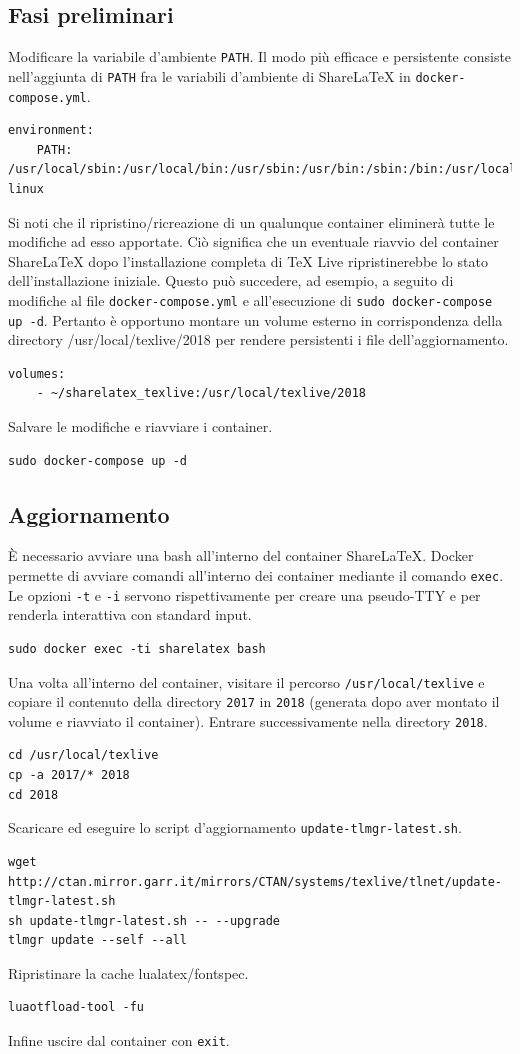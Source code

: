 \subsection{Fasi preliminari}
Modificare la variabile d'ambiente \verb|PATH|. Il modo più efficace e persistente consiste nell'aggiunta di \verb|PATH| fra le variabili d'ambiente di ShareLaTeX in \verb|docker-compose.yml|.
\begin{lstlisting}
environment:
    PATH: /usr/local/sbin:/usr/local/bin:/usr/sbin:/usr/bin:/sbin:/bin:/usr/local/texlive/2018/bin/x86_64-linux
\end{lstlisting}
Si noti che il ripristino/ricreazione di un qualunque container eliminerà tutte le modifiche ad esso apportate. Ciò significa che un eventuale riavvio del container ShareLaTeX dopo l'installazione completa di TeX Live ripristinerebbe lo stato dell'installazione iniziale. Questo può succedere, ad esempio, a seguito di modifiche al file \verb|docker-compose.yml| e all'esecuzione di \verb|sudo docker-compose up -d|. Pertanto è opportuno montare un volume esterno in corrispondenza della directory /usr/local/texlive/2018 per rendere persistenti i file dell'aggiornamento.
\begin{lstlisting}
volumes:
    - ~/sharelatex_texlive:/usr/local/texlive/2018
\end{lstlisting}
Salvare le modifiche e riavviare i container.
\begin{lstlisting}
sudo docker-compose up -d
\end{lstlisting}

\subsection{Aggiornamento}
È necessario avviare una bash all'interno del container ShareLaTeX. Docker permette di avviare comandi all'interno dei container mediante il comando \verb|exec|. Le opzioni \verb|-t| e \verb|-i| servono rispettivamente per creare una pseudo-TTY e per renderla interattiva con standard input.
\begin{lstlisting}
sudo docker exec -ti sharelatex bash
\end{lstlisting}
Una volta all'interno del container, visitare il percorso \verb|/usr/local/texlive| e copiare il contenuto della directory \verb|2017| in \verb|2018| (generata dopo aver montato il volume e riavviato il container). Entrare successivamente nella directory \verb|2018|.
\begin{lstlisting}
cd /usr/local/texlive
cp -a 2017/* 2018
cd 2018
\end{lstlisting}
Scaricare ed eseguire lo script d'aggiornamento \verb|update-tlmgr-latest.sh|.
\begin{lstlisting}
wget http://ctan.mirror.garr.it/mirrors/CTAN/systems/texlive/tlnet/update-tlmgr-latest.sh
sh update-tlmgr-latest.sh -- --upgrade
tlmgr update --self --all
\end{lstlisting}
Ripristinare la cache lualatex/fontspec.
\begin{lstlisting}
luaotfload-tool -fu
\end{lstlisting}
Infine uscire dal container con \verb|exit|.

